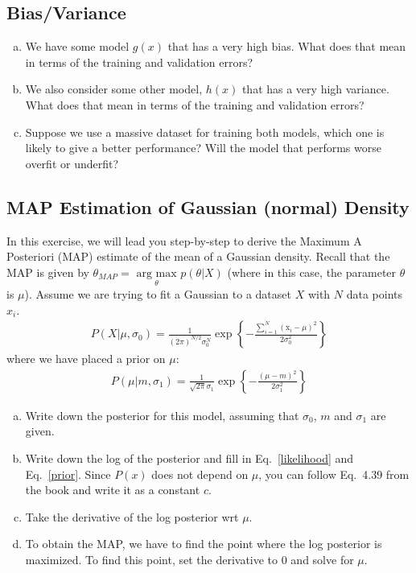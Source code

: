 \documentclass[11pt,a4paper]{article}
\begin{document}
\subsection{Bias/Variance}
\begin{enumerate}[(a)]
		\item  We have some model $g(x)$ that has a very high bias. What does that mean in terms of the training and validation errors?
		\item We also consider some other model, $h(x)$ that has a very high variance. What does that mean in terms of the training and validation errors?
		\item Suppose we use a massive dataset for training both models, which one is likely to give a better performance? Will the model that performs worse overfit or underfit?
\end{enumerate}

\subsection{MAP Estimation of Gaussian (normal) Density}

\newcommand{\bx}{\boldsymbol{x}}
\newcommand{\bmu}{\boldsymbol{\mu}}
\newcommand{\bSigma}{\boldsymbol{\Sigma}}
\newcommand{\bpi}{\boldsymbol{\pi}}
\newcommand{\bm}{\boldsymbol{m}}
\newcommand{\bS}{\boldsymbol{S}}
\newcommand{\bX}{\boldsymbol{X}}

In this exercise, we will lead you step-by-step to derive the Maximum A Posteriori (MAP) estimate of the mean of a Gaussian density. Recall that the MAP is given by $\theta_{MAP} = \underset{\theta}{\text{ arg max }} p(\theta|X)$ (where in this case, the parameter $\theta$ is $\mu$).
Assume we are trying to fit a Gaussian to a dataset $X$ with $N$ data points $x_i$.
\begin{align}
	P(X|\mu, \sigma_0) =
	\frac{1}{(2\pi)^{N/2} \sigma_0^{N}} \exp
	\left \{ -\frac{\sum^N_{i=1} (\text{x}_i -
	\mu)^2}{2\sigma_0^2}  \right \} \label{likelihood}
\end{align}
where we have placed a prior on $\mu$:
\begin{align}
	P(\mu|m, \sigma_1) =
	\frac{1}{\sqrt{2\pi} \sigma_1} \exp
	\left \{ -\frac{ (\mu -
	m)^2}{2\sigma_1^2}  \right \} \label{prior}
\end{align}
\begin{enumerate}[(a)]
	\item Write down the posterior for this model, assuming that $\sigma_0$, $m$ and $\sigma_1$ are given. 
	\item Write down the log of the posterior and fill in Eq.~\eqref{likelihood} and Eq.~\eqref{prior}. Since $P(x)$ does not depend on $\mu$, you can follow Eq.~4.39 from the book and write it as a constant $c$.
	\item Take the derivative of the log posterior wrt $\mu$.
	\item To obtain the MAP, we have to find the point where the log posterior is maximized. To find this point, set the derivative to 0 and solve for $\mu$.
\end{enumerate}
\end{document}
